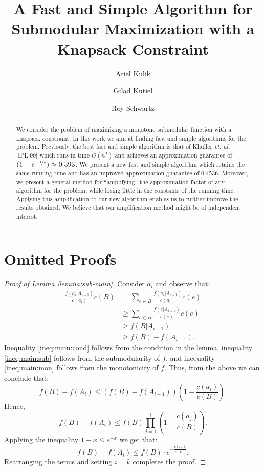 \documentclass[a4paper,UKenglish,cleveref, autoref]{lipics-v2019}
\title{A Fast and Simple Algorithm for Submodular Maximization with a Knapsack Constraint}
\author{Ariel Kulik}{Department of Computer Science, Technion, Haifa, Israel}{kulik@cs.technion.ac.il}{}{}
\author{Gilad Kutiel}{Department of Computer Science, Technion, Haifa, Israel}{gkutiel@cs.technion.ac.il}{}{}
\author{Roy Schwartz}{Department of Computer Science, Technion, Haifa, Israel}{schwartz@cs.technion.ac.il}{}{}
\begin{document}
\maketitle

\begin{abstract}
We consider the problem of maximizing a monotone submodular function with a knapsack constraint.
In this work we aim at finding fast and simple algorithms for the problem.
Previously, the best fast and simple algorithm is that of Khuller {\em et. al.} [IPL`99] which runs in time $O(n^2)$ and achieves an approximation guarantee of $(1-e^{-\nicefrac[]{1}{2}})\approx 0.393 $.
We present a new fast and simple algorithm which retains the same running time and has an improved approximation guarantee of $0.4536$.
Moreover, we present a general method for ``amplifying'' the approximation factor of any algorithm for the problem, while losing little in the constants of the running time.
Applying this amplification to our new algorithm enables us to further improve the results obtained.
We believe that our amplification method might be of independent interest.

\end{abstract}






\appendix
\section{Omitted Proofs}
\label{appendix:omitted}
\begin{proof}[Proof of Lemma \ref{lemma:sub-main}]
	

		Consider $a_i$ and observe that:
		\begin{align}
		\frac{f(a_i|A_{i-1})}{c(a_i)}c(B)
		& = \sum_{e \in B} \frac{f(a_i|A_{i-1})}{c(a_i)}c(e)
		\nonumber
		\\ 	& \geq \sum_{e \in B} \frac{f(e|A_{i-1})}{c(e)}c(e)
		\label{ineq:main:cond}
		\\	& \geq f(B|A_{i-1})
		\label{ineq:main:sub}
		\\ 	& \geq f(B) - f(A_{i-1}).
		\label{ineq:main:mon}
		\end{align}
		Inequality \eqref{ineq:main:cond} follows from the condition in the lemma, inequality \eqref{ineq:main:sub} follows from the submodularity of $f$, and inequality \eqref{ineq:main:mon} follows from the monotonicity of $f$.
		Thus, from the above we can conclude that:
		$$
		f(B) - f(A_i)  \leq (f(B) - f(A_{i - 1}))
		\left(1 - \frac{c(a_i)}{c(B)}\right).
		$$
		Hence,
		$$
		f(B) - f(A_i)  \leq f(B) \prod_{j = 1}^{i}
		\left(1 - \frac{c(a_j)}{c(B)}\right).
		$$
		Applying the inequality $1 - x \leq e^{-x}$ we get that:
		$$
		f(B) - f(A_i)  \leq f(B)\cdot
		e^{-\frac{c(A_i)}{c(B)}}.
		$$
		Rearranging the terms and setting $i = k$ completes the proof.

	
	
	
\end{proof}
\end{document}
